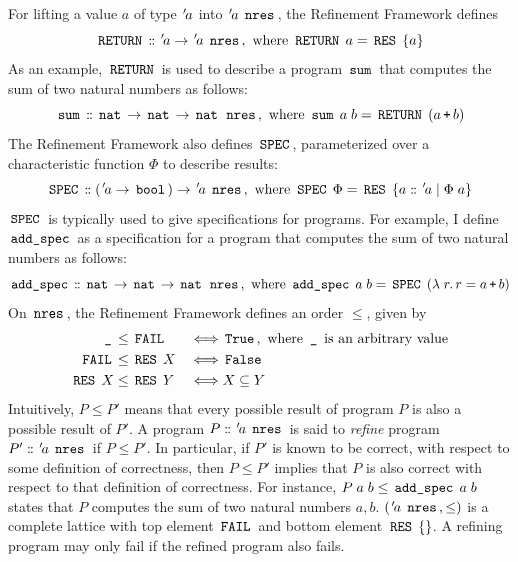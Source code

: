 For lifting a value $a$ of type ${\mskip2mu '\mskip-2mua}$ into ${\mskip2mu '\mskip-2mua} \; \,\text{\ttfamily nres}\,$, the Refinement Framework defines
$$
	\,\text{\ttfamily RETURN}\, \mathrel{\mathord{:}\mkern-1.2mu\mathord{:}} {\mskip2mu '\mskip-2mua} \rightarrow {\mskip2mu '\mskip-2mua} \; \,\text{\ttfamily nres}\,, \text{ where } \,\text{\ttfamily RETURN}\, \; a = \,\text{\ttfamily RES}\, \; \{a\}
$$
As an example, $\,\text{\ttfamily RETURN}\,$ is used to describe a program $\,\text{\ttfamily sum}\,$ that computes the sum of two natural numbers as follows:
$$
	\,\text{\ttfamily sum}\, \mathrel{\mathord{:}\mkern-1.2mu\mathord{:}} \,\text{\ttfamily nat}\, \rightarrow \,\text{\ttfamily nat}\, \rightarrow \,\text{\ttfamily nat}\, \; \,\text{\ttfamily nres}\,, \text{ where } \,\text{\ttfamily sum}\, \; a \; b = \,\text{\ttfamily RETURN}\, \; (a \,\text{\ttfamily +}\, b)
$$
The Refinement Framework also defines $\,\text{\ttfamily SPEC}\,$, parameterized over a characteristic function $\Phi$ to describe results:
$$
	\,\text{\ttfamily SPEC}\, \mathrel{\mathord{:}\mkern-1.2mu\mathord{:}} ({\mskip2mu '\mskip-2mua} \rightarrow \,\text{\ttfamily bool}\,) \rightarrow {\mskip2mu '\mskip-2mua} \; \,\text{\ttfamily nres}\,, \text{ where } \,\text{\ttfamily SPEC}\, \; \Phi = \,\text{\ttfamily RES}\, \; \{ a \mathrel{\mathord{:}\mkern-1.2mu\mathord{:}} {\mskip2mu '\mskip-2mua} \mid \Phi \; a \}
$$
$\,\text{\ttfamily SPEC}\,$ is typically used to give specifications for programs.
For example, I define $\,\text{\ttfamily add\_spec}\,$ as a specification for a program that computes the sum of two natural numbers as follows:
$$
	\,\text{\ttfamily add\_spec}\, \mathrel{\mathord{:}\mkern-1.2mu\mathord{:}} \,\text{\ttfamily nat}\, \rightarrow \,\text{\ttfamily nat}\, \rightarrow \,\text{\ttfamily nat}\, \; \,\text{\ttfamily nres}\,, \text{ where } \,\text{\ttfamily add\_spec}\, \; a \; b = \,\text{\ttfamily SPEC}\, \; (\lambda \; r.\, r = a \,\text{\ttfamily +}\, b)
$$
On $\,\text{\ttfamily nres}\,$, the Refinement Framework defines an order $\le$, given by
$$
	\begin{aligned}
		\,\text{\ttfamily \_}\,         & \le \,\text{\ttfamily FAIL}\,       &  & \Longleftrightarrow \,\text{\ttfamily True}\,, \text{ where $\,\text{\ttfamily \_}\,$ is an arbitrary value} \\
		\,\text{\ttfamily FAIL}\,       & \le \,\text{\ttfamily RES}\, \; X &  & \Longleftrightarrow \,\text{\ttfamily False}\,                                                 \\
		\,\text{\ttfamily RES}\, \; X & \le \,\text{\ttfamily RES}\, \; Y &  & \Longleftrightarrow X \subseteq Y
	\end{aligned}
$$
Intuitively, $P \le P'$ means that every possible result of program $P$ is also a possible result of $P'$.
A program $P \mathrel{\mathord{:}\mkern-1.2mu\mathord{:}} {\mskip2mu '\mskip-2mua} \; \,\text{\ttfamily nres}\,$ is said to \textit{refine} program $P' \mathrel{\mathord{:}\mkern-1.2mu\mathord{:}} {\mskip2mu '\mskip-2mua} \; \,\text{\ttfamily nres}\,$ if $P \le P'$.
In particular, if $P'$ is known to be correct, with respect to some definition of correctness, then $P \le P'$ implies that $P$ is also correct with respect to that definition of correctness.
For instance, $P \; a \; b \le \,\text{\ttfamily add\_spec}\, \; a \; b$ states that $P$ computes the sum of two natural numbers $a,b$.
$({\mskip2mu '\mskip-2mua} \; \,\text{\ttfamily nres}\,, \le)$ is a complete lattice with top element $\,\text{\ttfamily FAIL}\,$ and bottom element $\,\text{\ttfamily RES}\, \; \{\}$.
A refining program may only fail if the refined program also fails.

